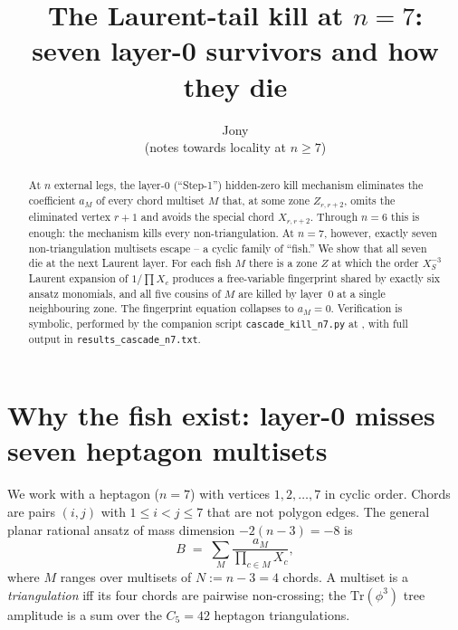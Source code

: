 \documentclass[11pt]{article}
\title{The Laurent-tail kill at $n=7$:\\
       seven layer-0 survivors and how they die}
\author{Jony \\ \small{(notes towards locality at $n\ge 7$)}}
\date{}
\theoremstyle{definition}
\begin{document}
\maketitle

\begin{abstract}
At $n$ external legs, the layer-0 (``Step-1'') hidden-zero kill mechanism
eliminates the coefficient $a_M$ of every chord multiset $M$ that, at
some zone $Z_{r,r+2}$, omits the eliminated vertex $r{+}1$ and avoids
the special chord $X_{r,r+2}$. Through $n=6$ this is enough: the
mechanism kills every non-triangulation. At $n=7$, however, exactly
seven non-triangulation multisets escape -- a cyclic family of ``fish.''
We show that all seven die at the next Laurent layer. For each fish
$M$ there is a zone $Z$ at which the order $X_S^{-3}$ Laurent expansion
of $1/\prod X_c$ produces a free-variable fingerprint shared by exactly
six ansatz monomials, and all five cousins of $M$ are killed by layer~0
at a single neighbouring zone. The fingerprint equation collapses to
$a_M=0$. Verification is symbolic, performed by the companion script
\verb|cascade_kill_n7.py| at \cite{repo}, with full output in
\verb|results_cascade_n7.txt|.
\end{abstract}

\section{Why the fish exist: layer-0 misses seven heptagon multisets}

We work with a heptagon ($n=7$) with vertices $1,2,\dots,7$ in cyclic
order. Chords are pairs $(i,j)$ with $1\le i<j\le 7$ that are not
polygon edges. The general planar rational ansatz of mass dimension
$-2(n{-}3)=-8$ is
\[
   B \;=\; \sum_{M} \frac{a_M}{\prod_{c\in M} X_c},
\]
where $M$ ranges over multisets of $N := n{-}3 = 4$ chords. A multiset
is a \emph{triangulation} iff its four chords are pairwise non-crossing;
the $\mathrm{Tr}(\phi^3)$ tree amplitude is a sum over the $C_5=42$
heptagon triangulations.
\end{document}
